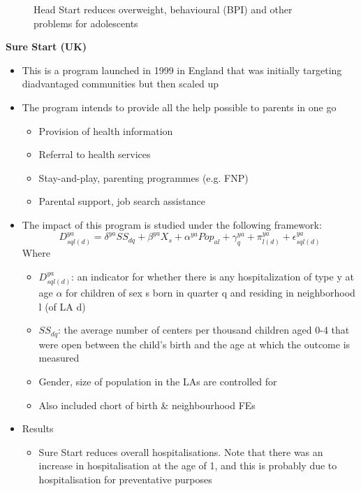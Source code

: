 \begin{itemize}
\begin{figure}[H]
                \caption{Head Start reduces overweight, behavioural (BPI) and other problems for adolescents}
                \label{CAP_eval}
                \end{figure}
            \end{itemize}
            \textbf{Sure Start (UK)}
            \begin{itemize}
            \item This is a program launched in  1999 in England that was initially targeting diadvantaged communities but then scaled up
            \item The program intends to provide all the help possible to parents in one go
            \begin{itemize}
                \item Provision of health information 
                \item Referral to health services
                \item Stay-and-play, parenting programmes (e.g. FNP)
                \item Parental support, job search assistance
            \end{itemize}
            \item The impact of this program is studied under the following framework:
            $$D^{ya}_{sql(d)}=\delta^{ya}SS_{dq}+\beta^{ya}X_s+\alpha^{ya}Pop_{al}+\gamma^{ya}_q+\pi^{ya}_{l(d)}+\epsilon^{ya}_{sql(d)} $$
            Where
            \begin{itemize}
            \item $D^{ya}_{sql(d)}$: an indicator for whether there is any hospitalization of type y at
        age $\alpha$ for children of sex s born in quarter q and residing in neighborhood l (of LA d)
        \item  $SS_{dq}$: the average number
        of centers per thousand children aged 0-4 that were open between the child’s birth and the age at
        which the outcome is measured
        \item Gender, size of population in the LAs are controlled for
        \item Also included chort of birth \& neighbourhood FEs
        \end{itemize}
        \item Results
        \begin{itemize}
            \item Sure Start reduces overall hospitalisations. Note that there was an increase in hospitalisation at the age of 1, and this is probably due to hospitalisation for preventative purposes

\end{itemize}
\end{itemize}
